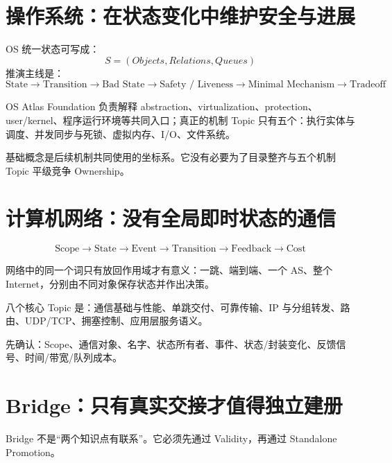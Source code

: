 \documentclass[11pt,a4paper]{ctexart}
\begin{document}
\section{操作系统：在状态变化中维护安全与进展}

\begin{corebox}
OS 统一状态可写成：
\[
S=(Objects,Relations,Queues)
\]
推演主线是：
\[
\boxed{
\text{State}
\to \text{Transition}
\to \text{Bad State}
\to \text{Safety / Liveness}
\to \text{Minimal Mechanism}
\to \text{Tradeoff}
}
\]
\end{corebox}

OS Atlas Foundation 负责解释 abstraction、virtualization、protection、user/kernel、程序运行环境等共同入口；真正的机制 Topic 只有五个：执行实体与调度、并发同步与死锁、虚拟内存、I/O、文件系统。

\begin{warn}
基础概念是后续机制共同使用的坐标系。它没有必要为了目录整齐与五个机制 Topic 平级竞争 Ownership。
\end{warn}

\section{计算机网络：没有全局即时状态的通信}

\begin{corebox}
\[
\boxed{
\text{Scope}
\to \text{State}
\to \text{Event}
\to \text{Transition}
\to \text{Feedback}
\to \text{Cost}
}
\]
\end{corebox}

网络中的同一个词只有放回作用域才有意义：一跳、端到端、一个 AS、整个 Internet，分别由不同对象保存状态并作出决策。

八个核心 Topic 是：通信基础与性能、单跳交付、可靠传输、IP 与分组转发、路由、UDP/TCP、拥塞控制、应用层服务语义。

\begin{method}[网络起手八问]
先确认：Scope、通信对象、名字、状态所有者、事件、状态/封装变化、反馈信号、时间/带宽/队列成本。
\end{method}

\section{Bridge：只有真实交接才值得独立建册}

Bridge 不是“两个知识点有联系”。它必须先通过 Validity，再通过 Standalone Promotion。
\end{document}
